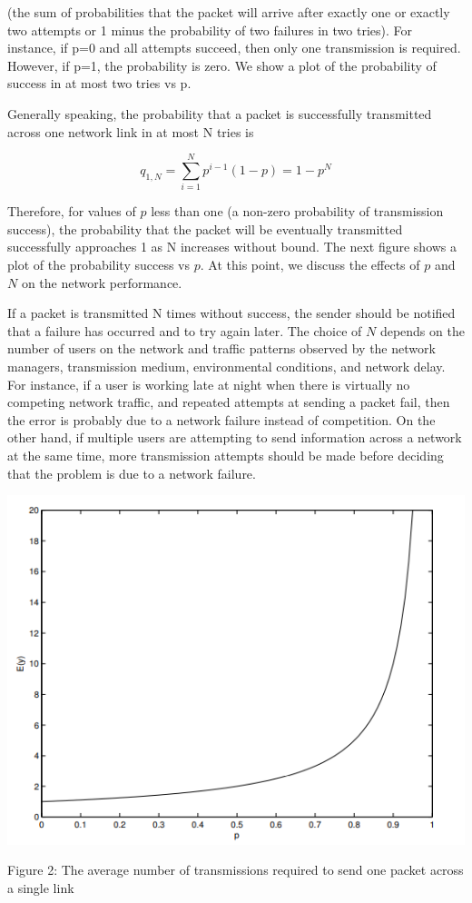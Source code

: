 \documentclass[10pt,twocolumn,letterpaper]{article}
\begin{document}
(the sum of probabilities that the packet will arrive after exactly one or exactly two attempts or 1 minus the probability of two failures in two tries). For instance, if p=0 and all attempts succeed, then only one transmission is required. However, if p=1, the probability is zero. We show a plot of the probability of success in at most two tries vs p.

Generally speaking, the probability that a packet is successfully transmitted across one network link in at most N tries is

$$ q_{1,N} = \sum_{i=1}^{N} p^{i-1}(1-p) = 1-p^N $$

Therefore, for values of $p$ less than one (a non-zero probability of transmission success), the probability that the packet will be eventually transmitted successfully approaches 1 as N increases without bound. The next figure shows a plot of the probability success vs $p$. At this point, we discuss the effects of $p$ and $N$ on the network performance.

If a packet is transmitted N times without success, the sender should be notified that a failure has occurred and to try again later. The choice of $N$ depends on the number of users on the network and traffic patterns observed by the network managers, transmission medium, environmental conditions, and network delay. For instance, if a user is working late at night when there is virtually no competing network traffic, and repeated attempts at sending a packet fail, then the error is probably due to a network failure instead of competition. On the other hand, if multiple users are attempting to send information across a network at the same time, more transmission attempts should be made before deciding that the problem is due to a network failure.

\includegraphics[width=\linewidth]{plots/fig2.PNG}
\caption{Figure 2: The average number of transmissions required to send one packet across a single link}
\end{document}
